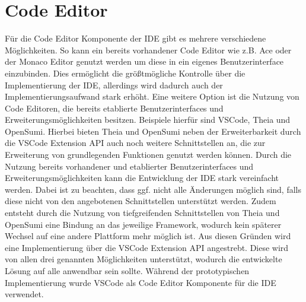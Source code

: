 \section{Code Editor}\label{section:prototypische-implementierung:code-editor}

Für die Code Editor Komponente der IDE gibt es mehrere verschiedene Möglichkeiten. So kann ein bereits vorhandener Code Editor wie z.B. Ace oder der Monaco Editor genutzt werden um diese in ein eigenes Benutzerinterface einzubinden. Dies ermöglicht die größtmögliche Kontrolle über die Implementierung der IDE, allerdings wird dadurch auch der Implementierungsaufwand stark erhöht. Eine weitere Option ist die Nutzung von Code Editoren, die bereits etablierte Benutzerinterfaces und Erweiterungsmöglichkeiten besitzen. Beispiele hierfür sind VSCode, Theia und OpenSumi. Hierbei bieten Theia und OpenSumi neben der Erweiterbarkeit durch die VSCode Extension API auch noch weitere Schnittstellen an, die zur Erweiterung von grundlegenden Funktionen genutzt werden können. Durch die Nutzung bereits vorhandener und etablierter Benutzerinterfaces und Erweiterungsmöglichkeiten kann die Entwicklung der IDE stark vereinfacht werden. Dabei ist zu beachten, dass ggf. nicht alle Änderungen möglich sind, falls diese nicht von den angebotenen Schnittstellen unterstützt werden. Zudem entsteht durch die Nutzung von tiefgreifenden Schnittstellen von Theia und OpenSumi eine Bindung an das jeweilige Framework, wodurch kein späterer Wechsel auf eine andere Plattform mehr möglich ist. Aus diesen Gründen wird eine Implementierung über die VSCode Extension API angestrebt. Diese wird von allen drei genannten Möglichkeiten unterstützt, wodurch die entwickelte Lösung auf alle anwendbar sein sollte. Während der prototypischen Implementierung wurde VSCode als Code Editor Komponente für die IDE verwendet.